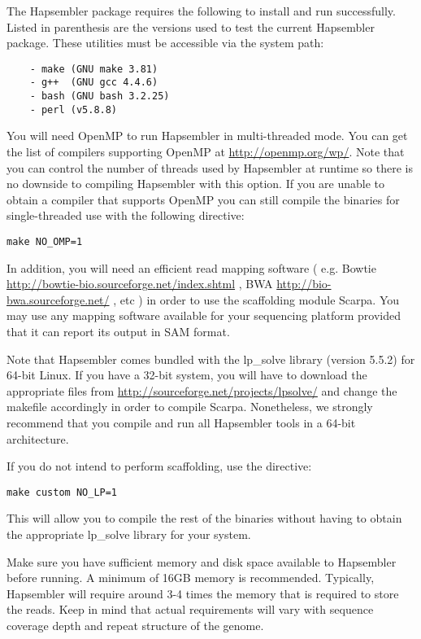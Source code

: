\documentclass[12pt,a4paper]{report}
\begin{document}
The Hapsembler package requires the following to install and run successfully. Listed in parenthesis are the versions used to test the current Hapsembler package. These utilities must be accessible via the system path:

\begin{verbatim}
    - make (GNU make 3.81)
    - g++  (GNU gcc 4.4.6)
    - bash (GNU bash 3.2.25)
    - perl (v5.8.8)
\end{verbatim}

You will need OpenMP to run Hapsembler in multi-threaded mode. You can get the list of compilers supporting OpenMP at \url{http://openmp.org/wp/}. Note that you can control the number of threads used by Hapsembler at runtime so there is no downside to compiling Hapsembler with this option. If you are unable to obtain a compiler that supports OpenMP you can still compile the binaries for single-threaded use with the following directive:

\begin{verbatim}
make NO_OMP=1
\end{verbatim}

In addition, you will need an efficient read mapping software ( e.g. Bowtie \url{http://bowtie-bio.sourceforge.net/index.shtml} , BWA
\url{http://bio-bwa.sourceforge.net/} , etc ) in order to use the scaffolding module Scarpa. You may use any mapping software available for your sequencing platform provided that it can report its output in SAM format.

Note that Hapsembler comes bundled with the lp\_solve library (version 5.5.2) for 64-bit Linux. If you have a 32-bit system, you will have to download the appropriate files from \url{http://sourceforge.net/projects/lpsolve/} and change the makefile accordingly in order to compile Scarpa. Nonetheless, we strongly recommend that you compile and run all Hapsembler tools in a 64-bit architecture. 

If you do not intend to perform scaffolding, use the directive:

\begin{verbatim}
make custom NO_LP=1
\end{verbatim}

This will allow you to compile the rest of the binaries without having to obtain the appropriate lp\_solve library for your system.

Make sure you have sufficient memory and disk space available to Hapsembler before running. A minimum of 16GB memory is recommended. Typically, Hapsembler will require around 3-4 times the memory that is required to store the reads. Keep in mind that actual requirements will vary with sequence coverage depth and repeat structure of the genome.
\end{document}
